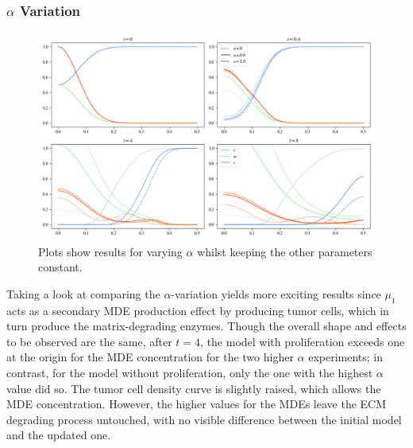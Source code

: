 \subsubsection*{$\alpha$ Variation}
\begin{figure}[h!]
    \centering
    \includegraphics[width=\textwidth]{resources/images/prolif_alpha_variation.png}
    \caption{Plots show results for varying $\alpha$ whilst keeping the other parameters constant.}
    \label{fig:prolif_alpha_variation}
\end{figure}

Taking a look at comparing the $\alpha$-variation yields more exciting results since $\mu_1$ acts as a secondary MDE production effect by producing tumor cells, which in turn produce the matrix-degrading enzymes. Though the overall shape and effects to be observed are the same, after $t=4$, the model with proliferation exceeds one at the origin for the MDE concentration for the two higher $\alpha$ experiments; in contrast, for the model without proliferation, only the one with the highest $\alpha$ value did so. The tumor cell density curve is slightly raised, which allows the MDE concentration. However, the higher values for the MDEs leave the ECM degrading process untouched, with no visible difference between the initial model and the updated one.

